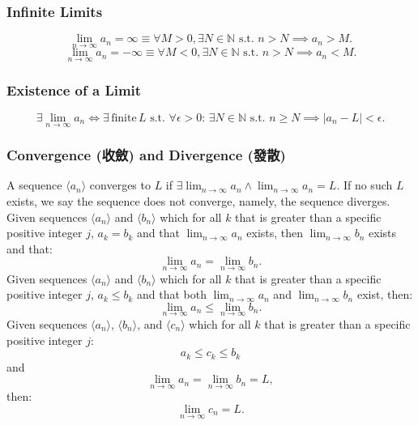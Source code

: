 \documentclass[a4paper,12pt]{report}
\begin{document}
\subsubsection{Infinite Limits}
\[\lim_{n\to \infty}a_n=\infty \equiv \forall M > 0, \exists N \in\mathbb{N} \text{\ s.t.\ } n > N \implies a_n > M.\]
\[\lim_{n\to \infty}a_n=-\infty \equiv \forall M < 0, \exists N \in\mathbb{N} \text{\ s.t.\ } n > N \implies a_n < M.\]
\subsubsection{Existence of a Limit}
\[\exists\lim_{n\to \infty}a_n\iff\exists \,\text{finite}\,L\text{\ s.t.\ } \forall \epsilon > 0:\, \exists N \in\mathbb{N}\text{\ s.t.\ } n \geq N\implies |a_n - L| < \epsilon.\]
\subsubsection{Convergence (收斂) and Divergence (發散)}
A sequence \(\langle a_n\rangle\) converges to \(L\) if \(\exists \lim_{n \to \infty} a_n \land \lim_{n \to \infty} a_n = L\). If no such \(L\) exists, we say the sequence does not converge, namely, the sequence diverges.
Given sequences $\langle a_n\rangle$ and $\langle b_n\rangle$ which for all $k$ that is greater than a specific positive integer $j$, $a_k=b_k$ and that $\lim_{n\to\infty}a_n$ exists, then $\lim_{n\to\infty}b_n$ exists and that:
\[\lim_{n\to\infty}a_n=\lim_{n\to\infty}b_n.\]
Given sequences $\langle a_n\rangle$ and $\langle b_n\rangle$ which for all $k$ that is greater than a specific positive integer $j$, $a_k\leq b_k$ and that both $\lim_{n\to\infty}a_n$ and $\lim_{n\to\infty}b_n$ exist, then:
\[\lim_{n\to\infty}a_n\leq\lim_{n\to\infty}b_n.\]
Given sequences $\langle a_n\rangle$, $\langle b_n\rangle$, and $\langle c_n\rangle$ which for all $k$ that is greater than a specific positive integer $j$:
\[a_k\leq c_k\leq b_k\]
and
\[\lim_{n\to\infty}a_n=\lim_{n\to\infty}b_n=L,\]
then: 
\[\lim_{n\to\infty}c_n=L.\]
\end{document}
